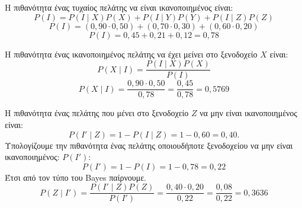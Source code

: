 \documentclass[11pt,a4paper]{article}
\newcommand{\eng}[1]{\selectlanguage{english}#1\selectlanguage{greek}}
\begin{document}
\begin{Alist}
\begin{rlist}
Η πιθανότητα ένας τυχαίος πελάτης να είναι ικανοποιημένος είναι:
$$P(I) = P(I \mid X) P(X) + P(I \mid Y) P(Y) + P(I \mid Z) P(Z)$$
$$P(I) = (0,90 \cdot 0,50) + (0,70 \cdot 0,30) + (0,60 \cdot 0,20)$$
$$P(I) = 0,45 + 0,21 + 0,12 = 0,78$$
\item Η πιθανότητα ένας ικανοποιημένος πελάτης να έχει μείνει στο ξενοδοχείο $X$ είναι:
$$P(X \mid I) = \frac{P(I \mid X) P(X)}{P(I)}$$
$$P(X \mid I) = \frac{0,90 \cdot 0,50}{0,78} = \frac{0,45}{0,78} = 0,5769$$
\item Η πιθανότητα ένας πελάτης που μένει στο ξενοδοχείο $Z$ να μην είναι ικανοποιημένος είναι: 
\[P(I' \mid Z) = 1 - P(I \mid Z) = 1 - 0,60 = 0,40.\]
Υπολογίζουμε την πιθανότητα ένας πελάτης οποιουδήποτε ξενοδοχείου να μην είναι ικανοποιημένος: $P(I')$:
$$P(I') = 1 - P(I) = 1 - 0,78 = 0,22$$
Έτσι από τον τύπο του \eng{Bayes} παίρνουμε.
$$P(Z \mid I') = \frac{P(I' \mid Z) P(Z)}{P(I')} = \frac{0,40 \cdot 0,20}{0,22} = \frac{0,08}{0,22}= 0,3636$$
\end{rlist}
\end{Alist}
\end{document}
